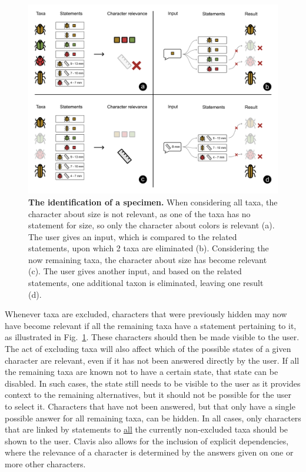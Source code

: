 \documentclass[10pt,letterpaper]{article}
\begin{document}
\begin{figure}[!h]
  \includegraphics[width=\textwidth]{Images/Fig2}
  \caption{{\bf The identification of a specimen.}
  When considering all taxa, the character about size is not relevant, as one of the taxa has no statement for size, so only the character about colors is relevant (a). The user gives an input, which is compared to the related statements, upon which 2 taxa are eliminated (b). Considering the now remaining taxa, the character about size has become relevant (c). The user gives another input, and based on the related statements, one additional taxon is eliminated, leaving one result (d).
  }
  \label{fig2}
 \end{figure}

Whenever taxa are excluded, characters that were previously hidden may now have become relevant if all the remaining taxa have a statement pertaining to it, as illustrated in Fig.~\ref{fig2}. These characters should then be made visible to the user. The act of excluding taxa will also affect which of the possible states of a given character are relevant, even if it has not been answered directly by the user. If all the remaining taxa are known not to have a certain state, that state can be disabled. In such cases, the state still needs to be visible to the user as it provides context to the remaining alternatives, but it should not be possible for the user to select it. Characters that have not been answered, but that only have a single possible answer for all remaining taxa, can be hidden. In all cases, only characters that are linked by statements to \underline{all} the currently non-excluded taxa should be shown to the user. Clavis also allows for the inclusion of explicit dependencies, where the relevance of a character is determined by the answers given on one or more other characters.
\end{document}
